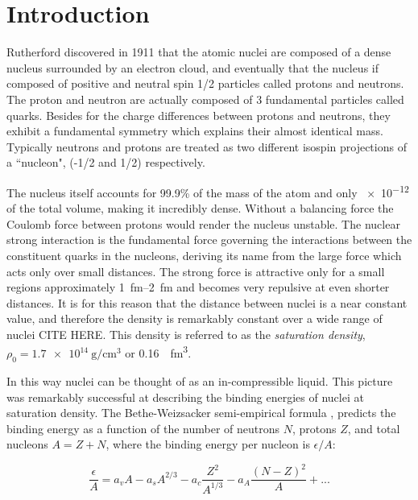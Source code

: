 \chapter{Introduction}

Rutherford discovered in 1911 that the atomic nuclei are composed of a dense nucleus surrounded by an electron cloud, and eventually that the nucleus if composed of positive and neutral spin 1/2 particles called protons and neutrons. The proton and neutron are actually composed of 3 fundamental particles called quarks. Besides for the charge differences between protons and neutrons, they exhibit a fundamental symmetry which explains their almost identical mass. Typically neutrons and protons are treated as two different isospin projections of a ``nucleon", (-1/2 and 1/2) respectively.



The nucleus itself accounts for 99.9\% of the mass of the atom and only \num{e-12} of the total volume, making it incredibly dense. Without a balancing force the Coulomb force between protons would render the nucleus unstable. The nuclear strong interaction is the fundamental force governing the interactions between the constituent quarks in the nucleons, deriving its name from the large force which acts only over small distances. The strong force is attractive only for a small regions approximately \SIrange{1}{2}{\femto\metre} and becomes very repulsive at even shorter distances. It is for this reason that the distance between nuclei is a near constant value, and therefore the density is remarkably constant over a wide range of nuclei CITE HERE. This density is referred to as the  \emph{saturation density}, $\rho_0 = \SI{1.7e14}{\gram\per\centi\metre\cubed}$ or \SI{0.16}{\per\femto\metre\cubed}.  

 In this way nuclei can be thought of as an in-compressible liquid. This picture was remarkably successful at describing the binding energies of nuclei at saturation density. The Bethe-Weizsacker semi-empirical formula \cite{awayforward}, predicts the binding energy as a function of the number of neutrons $N$, protons $Z$, and total nucleons $A = Z + N$, where the binding energy per nucleon is $\epsilon/A$:
 
\begin{equation}
\frac{\epsilon}{A} = a_vA - a_s A^{2/3} - a_c \frac{Z^2}{A^{1/3}} - a_A\frac{(N - Z)^2}{A} + ...
\label{eq:semiEmp}
\end{equation}

